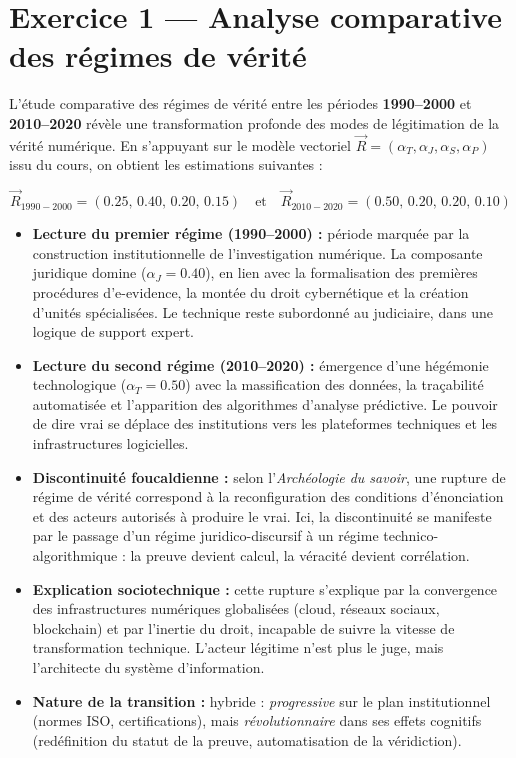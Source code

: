 \documentclass[memoire, 12pt]{report}
\begin{document}
\tableofcontents

\newpage
\section{Exercice 1 — Analyse comparative des régimes de vérité}

L’étude comparative des régimes de vérité entre les périodes \textbf{1990--2000} et \textbf{2010--2020} révèle une transformation profonde des modes de légitimation de la vérité numérique. En s’appuyant sur le modèle vectoriel $\vec{R} = (\alpha_T, \alpha_J, \alpha_S, \alpha_P)$ issu du cours, on obtient les estimations suivantes :

\[
\vec{R}_{1990-2000} = (0.25,\,0.40,\,0.20,\,0.15)
\quad\text{et}\quad
\vec{R}_{2010-2020} = (0.50,\,0.20,\,0.20,\,0.10)
\]

\begin{itemize}
    \item \textbf{Lecture du premier régime (1990--2000) :} période marquée par la construction institutionnelle de l’investigation numérique. La composante juridique domine ($\alpha_J=0.40$), en lien avec la formalisation des premières procédures d’e-evidence, la montée du droit cybernétique et la création d’unités spécialisées. Le technique reste subordonné au judiciaire, dans une logique de support expert.
    
    \item \textbf{Lecture du second régime (2010--2020) :} émergence d’une hégémonie technologique ($\alpha_T=0.50$) avec la massification des données, la traçabilité automatisée et l’apparition des algorithmes d’analyse prédictive. Le pouvoir de dire vrai se déplace des institutions vers les plateformes techniques et les infrastructures logicielles.
    
    \item \textbf{Discontinuité foucaldienne :} selon l’\textit{Archéologie du savoir}, une rupture de régime de vérité correspond à la reconfiguration des conditions d’énonciation et des acteurs autorisés à produire le vrai. Ici, la discontinuité se manifeste par le passage d’un régime juridico-discursif à un régime technico-algorithmique : la preuve devient calcul, la véracité devient corrélation.
    
    \item \textbf{Explication sociotechnique :} cette rupture s’explique par la convergence des infrastructures numériques globalisées (cloud, réseaux sociaux, blockchain) et par l’inertie du droit, incapable de suivre la vitesse de transformation technique. L’acteur légitime n’est plus le juge, mais l’architecte du système d’information.
    
    \item \textbf{Nature de la transition :} hybride : \textit{progressive} sur le plan institutionnel (normes ISO, certifications), mais \textit{révolutionnaire} dans ses effets cognitifs (redéfinition du statut de la preuve, automatisation de la véridiction).
\end{itemize}
\end{document}
